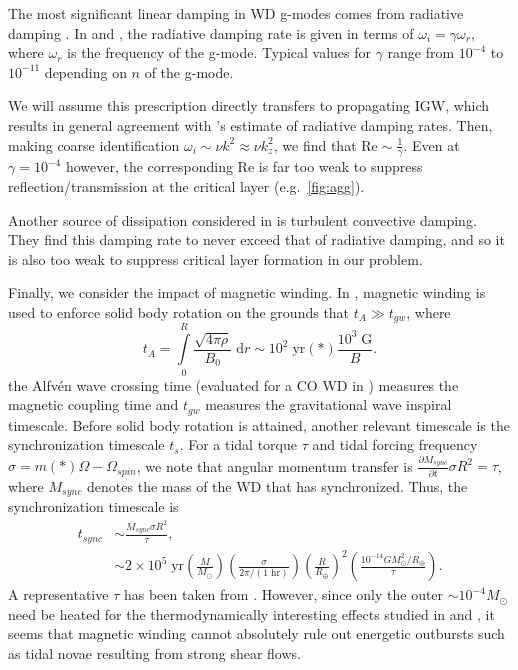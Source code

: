 \documentclass[
        fleqn,
        usenatbib,
    ]{mnras}
\newcommand*{\pd}[2]{\frac{\partial#1}{\partial#2}}
\newcommand*{\p}[1]{\left(#1\right)}
\begin{document}
The most significant linear damping in WD g-modes comes from radiative damping
\citep{fullerI}. In \citep{wu} and \citep{fullerI}, the radiative damping rate
is given in terms of $\omega_i = \gamma \omega_r$, where $\omega_r$ is the
frequency of the g-mode. Typical values for $\gamma$ range from $10^{-4}$ to
$10^{-11}$ depending on $n$ of the g-mode.

We will assume this prescription directly transfers to propagating IGW, which
results in general agreement with \citep{bukart}'s estimate of radiative damping
rates. Then, making coarse identification $\omega_i \sim \nu k^2 \approx \nu
k_z^2$, we find that $\mathrm{Re} \sim \frac{1}{\gamma}$. Even at $\gamma =
10^{-4}$ however, the corresponding $\mathrm{Re}$ is far too weak to suppress
reflection/transmission at the critical layer (e.g.\ \autoref{fig:agg}).

Another source of dissipation considered in \citep{bukart} is turbulent
convective damping. They find this damping rate to never exceed that of
radiative damping, and so it is also too weak to suppress critical layer
formation in our problem.

Finally, we consider the impact of magnetic winding. In \citep{bukart}, magnetic
winding is used to enforce solid body rotation on the grounds that $t_A \gg
t_{gw}$, where
\begin{equation}
    t_A = \int\limits_0^R \frac{\sqrt{4\pi \rho}}{B_0}\;\mathrm{d}r
        \sim 10^2\;\mathrm{yr}\p*{\frac{10^3\;\mathrm{G}}{B}}.
\end{equation}
the Alfv\'en wave crossing time (evaluated for a CO WD in \citep{fullerIV})
measures the magnetic coupling time and $t_{gw}$ measures the gravitational wave
inspiral timescale. Before solid body rotation is attained, another relevant
timescale is the synchronization timescale $t_s$. For a tidal torque $\tau$ and
tidal forcing frequency $\sigma = m\p*{\Omega - \Omega_{spin}}$, we note that
angular momentum transfer is $\pd{M_{sync}}{t} \sigma R^2 = \tau$, where
$M_{sync}$ denotes the mass of the WD that has synchronized. Thus, the
synchronization timescale is
\begin{align}
    t_{sync} &\sim \frac{M_{sync}\sigma R^2}{\tau},\nonumber\\
        &\sim 2 \times 10^5\;\mathrm{yr}
            \p{\frac{M}{M_{\odot}}}
            \p{\frac{\sigma}{2\pi / (1\;\mathrm{hr})}}
            \p{\frac{R}{R_{\oplus}}}^2
            \p{\frac{10^{-14} GM_{\odot}^2/R_{\oplus}}{\tau}}.
\end{align}
A representative $\tau$ has been taken from \citep{bukart}. However, since only
the outer $\sim 10^{-4}M_{\odot}$ need be heated for the thermodynamically
interesting effects studied in \citep{fullerIV} and \citep{tidal_novae}, it
seems that magnetic winding cannot absolutely rule out energetic outbursts such
as tidal novae resulting from strong shear flows.
\end{document}
